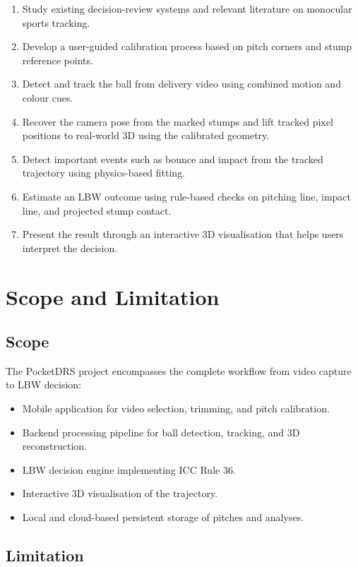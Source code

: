 \documentclass[12pt,a4paper]{report}
\begin{document}
\begin{enumerate}
    \item Study existing decision-review systems and relevant literature on monocular sports tracking.
    \item Develop a user-guided calibration process based on pitch corners and stump reference points.
    \item Detect and track the ball from delivery video using combined motion and colour cues.
    \item Recover the camera pose from the marked stumps and lift tracked pixel positions to real-world 3D using the calibrated geometry.
    \item Detect important events such as bounce and impact from the tracked trajectory using physics-based fitting.
    \item Estimate an LBW outcome using rule-based checks on pitching line, impact line, and projected stump contact.
    \item Present the result through an interactive 3D visualisation that helps users interpret the decision.
\end{enumerate}

\section{Scope and Limitation}

\subsection{Scope}

The PocketDRS project encompasses the complete workflow from video capture to LBW decision:
\begin{itemize}
    \item Mobile application for video selection, trimming, and pitch calibration.
    \item Backend processing pipeline for ball detection, tracking, and 3D reconstruction.
    \item LBW decision engine implementing ICC Rule 36.
    \item Interactive 3D visualisation of the trajectory.
    \item Local and cloud-based persistent storage of pitches and analyses.
\end{itemize}

\subsection{Limitation}
\end{document}
